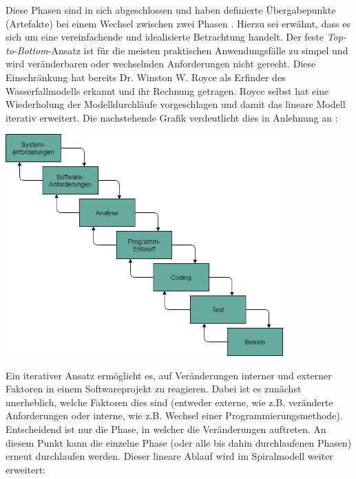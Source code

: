 Diese Phasen sind in sich abgeschlossen und haben definierte Übergabepunkte (Artefakte) bei einem Wechsel zwischen zwei Phasen \cite[S. 155]{Ludwig_Lichter_2013}. Hierzu sei erwähnt, dass es sich um eine vereinfachende und idealisierte Betrachtung handelt. Der feste \textit{Top-to-Bottom}-Ansatz ist für die meisten praktischen Anwendungsfälle zu simpel und wird veränderbaren oder wechselnden Anforderungen nicht gerecht. Diese Einschränkung hat bereits  Dr. Winston W. Royce als Erfinder des Wasserfallmodells \cite{royce1987managing} erkannt und ihr Rechnung getragen. Royce selbst hat eine Wiederholung der Modelldurchläufe vorgeschlagen \cite{Larmann_Basili_2003} und damit das lineare Modell iterativ erweitert. Die nachstehende Grafik verdeutlicht dies in Anlehnung an \cite[Abb. 3]{royce1987managing}:

\begin{center}
    \includegraphics[width=0.8\textwidth]{Grafiken/IterativesWasserfallmodell.png}
    \label{Grafik:Iteratives Wasserfallmodell nach Royce}
\end{center}

Ein iterativer Ansatz ermöglicht es, auf Veränderungen interner und externer Faktoren in einem Softwareprojekt zu reagieren. Dabei ist es zunächst unerheblich, welche Faktoren dies sind (entweder externe, wie z.B. veränderte Anforderungen oder interne, wie z.B. Wechsel einer Programmierungsmethode). Entscheidend ist nur die Phase, in welcher die Veränderungen auftreten. An diesem Punkt kann die einzelne Phase (oder alle bis dahin durchlaufenen Phasen) erneut durchlaufen werden. Dieser lineare Ablauf wird im Spiralmodell weiter erweitert:

